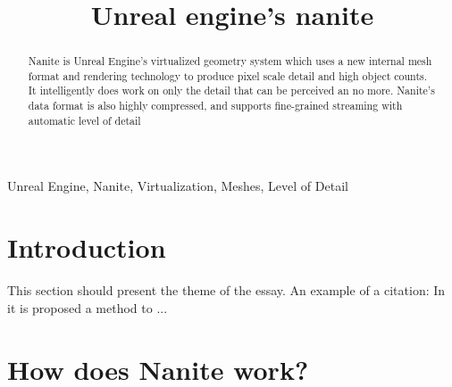 \documentclass[conference]{IEEEtran}
\begin{document}
\title{Unreal engine’s nanite\\
}


\author{

}




\maketitle

\IEEEpubidadjcol
\begin{abstract}
Nanite is Unreal Engine's virtualized geometry system which uses a new internal mesh format and rendering technology to produce pixel scale detail and high object counts. It intelligently does work on only the detail that can be perceived an no more. Nanite's data format is also highly compressed, and supports fine-grained streaming with automatic level of detail 
\end{abstract}

\begin{IEEEkeywords}
Unreal Engine, Nanite, Virtualization, Meshes, Level of Detail
\end{IEEEkeywords}


\section{Introduction}

This section should present the theme of the essay. An example of a citation: In \cite{kim2} it is proposed a method to ...


\section{How does Nanite work?}
\label{sec:first}
\end{document}
